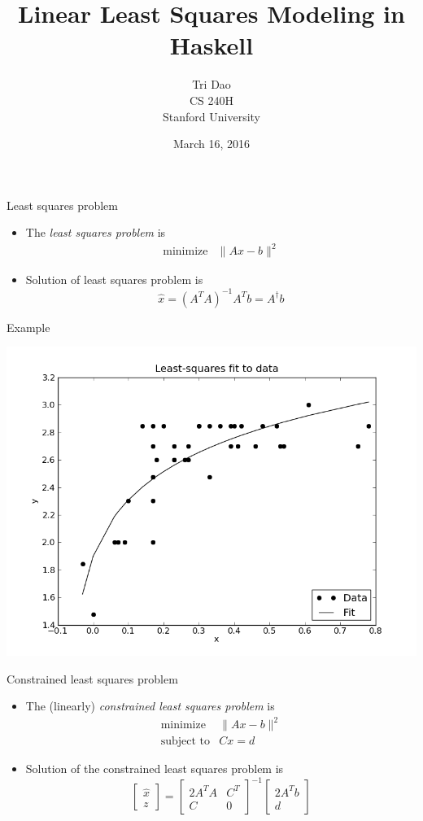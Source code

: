 \documentclass[11pt,mathserif]{beamer}
\title{\large \bfseries Linear Least Squares Modeling in Haskell}
\author{Tri Dao\\[3ex]
CS 240H\\
Stanford University}
\date{March 16, 2016}
\begin{document}
\frame{
\thispagestyle{empty}
\titlepage
}

\begin{frame}{Least squares problem}

\begin{itemize}
  \item The \emph{least squares problem} is
  \[
    \begin{array}{ll}
      \mbox{minimize} & \|Ax-b\|^2
    \end{array}
  \]
  \item Solution of least squares problem is
  \[
    \hat x = (A^T A)^{-1} A^T b = A^\dagger b
  \]
\end{itemize}
\end{frame}

\begin{frame}{Example}
\begin{center}
\includegraphics[width=\linewidth]{figures/data_fit.png}
\end{center}
\end{frame}

\begin{frame}{Constrained least squares problem}
\begin{itemize}
  \item The (linearly) \emph{constrained least squares problem} is
  \[
    \begin{array}{ll}
      \mbox{minimize} & \|Ax-b\|^2 \\
      \mbox{subject to} & Cx = d
    \end{array}
  \]
  \item Solution of the constrained least squares problem is
  \[
    \left[\begin{array}{c} \hat x \\ z \end{array}\right] =
    \left[\begin{array}{cc} 2A^TA & C^T \\ C & 0 \end{array}\right]^{-1}
    \left[\begin{array}{c} 2A^Tb \\ d \end{array}\right]
  \]
\end{itemize}
\end{frame}
\end{document}
